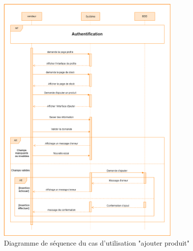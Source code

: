 \documentclass[edit,12pt,a4paper,ChapStyle,oneside,doubleinterligne]{report}
\begin{document}
\begin{figure}[h!]\label{fig:Diagramme cas 5}
\centering
\includegraphics[width=0.8\textwidth]{images/Ajouter produits.png}
\caption{Diagramme de séquence du cas d'utilisation "ajouter produit"}
\end{figure}
\clearpage
\end{document}
